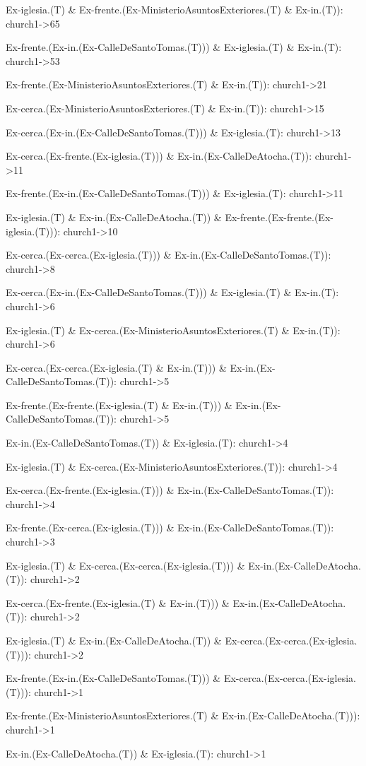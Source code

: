Ex-iglesia.(T) \& Ex-frente.(Ex-MinisterioAsuntosExteriores.(T) \& Ex-in.(T)): church1->65

Ex-frente.(Ex-in.(Ex-CalleDeSantoTomas.(T))) \& Ex-iglesia.(T) \& Ex-in.(T): church1->53

Ex-frente.(Ex-MinisterioAsuntosExteriores.(T) \& Ex-in.(T)): church1->21

Ex-cerca.(Ex-MinisterioAsuntosExteriores.(T) \& Ex-in.(T)): church1->15

Ex-cerca.(Ex-in.(Ex-CalleDeSantoTomas.(T))) \& Ex-iglesia.(T): church1->13

Ex-cerca.(Ex-frente.(Ex-iglesia.(T))) \& Ex-in.(Ex-CalleDeAtocha.(T)): church1->11

Ex-frente.(Ex-in.(Ex-CalleDeSantoTomas.(T))) \& Ex-iglesia.(T): church1->11

Ex-iglesia.(T) \& Ex-in.(Ex-CalleDeAtocha.(T)) \& Ex-frente.(Ex-frente.(Ex-iglesia.(T))): church1->10

Ex-cerca.(Ex-cerca.(Ex-iglesia.(T))) \& Ex-in.(Ex-CalleDeSantoTomas.(T)): church1->8

Ex-cerca.(Ex-in.(Ex-CalleDeSantoTomas.(T))) \& Ex-iglesia.(T) \& Ex-in.(T): church1->6

Ex-iglesia.(T) \& Ex-cerca.(Ex-MinisterioAsuntosExteriores.(T) \& Ex-in.(T)): church1->6

Ex-cerca.(Ex-cerca.(Ex-iglesia.(T) \& Ex-in.(T))) \& Ex-in.(Ex-CalleDeSantoTomas.(T)): church1->5

Ex-frente.(Ex-frente.(Ex-iglesia.(T) \& Ex-in.(T))) \& Ex-in.(Ex-CalleDeSantoTomas.(T)): church1->5

Ex-in.(Ex-CalleDeSantoTomas.(T)) \& Ex-iglesia.(T): church1->4

Ex-iglesia.(T) \& Ex-cerca.(Ex-MinisterioAsuntosExteriores.(T)): church1->4

Ex-cerca.(Ex-frente.(Ex-iglesia.(T))) \& Ex-in.(Ex-CalleDeSantoTomas.(T)): church1->4

Ex-frente.(Ex-cerca.(Ex-iglesia.(T))) \& Ex-in.(Ex-CalleDeSantoTomas.(T)): church1->3

Ex-iglesia.(T) \& Ex-cerca.(Ex-cerca.(Ex-iglesia.(T))) \& Ex-in.(Ex-CalleDeAtocha.(T)): church1->2

Ex-cerca.(Ex-frente.(Ex-iglesia.(T) \& Ex-in.(T))) \& Ex-in.(Ex-CalleDeAtocha.(T)): church1->2

Ex-iglesia.(T) \& Ex-in.(Ex-CalleDeAtocha.(T)) \& Ex-cerca.(Ex-cerca.(Ex-iglesia.(T))): church1->2

Ex-frente.(Ex-in.(Ex-CalleDeSantoTomas.(T))) \& Ex-cerca.(Ex-cerca.(Ex-iglesia.(T))): church1->1

Ex-frente.(Ex-MinisterioAsuntosExteriores.(T) \& Ex-in.(Ex-CalleDeAtocha.(T))): church1->1

Ex-in.(Ex-CalleDeAtocha.(T)) \& Ex-iglesia.(T): church1->1

